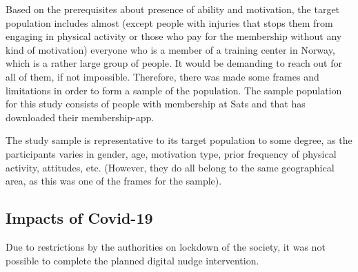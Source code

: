 Based on the prerequisites about presence of ability and motivation, the target population includes almost (except people with injuries that stops them from engaging in physical activity or those who pay for the membership without any kind of motivation) everyone who is a member of a training center in Norway, which is a rather large group of people. It would be demanding to reach out for all of them, if not impossible. Therefore, there was made some frames and limitations in order to form a sample of the population. The sample population for this study consists of people with membership at Sats and that has downloaded their membership-app. 
 
The study sample is representative to its target population to some degree, as the participants varies in gender, age, motivation type, prior frequency of physical activity, attitudes, etc. (However, they do all belong to the same geographical area, as this was one of the frames for the sample).

\subsection{Impacts of Covid-19}
Due to restrictions by the authorities on lockdown of the society, it was not possible to complete the planned digital nudge intervention. 




